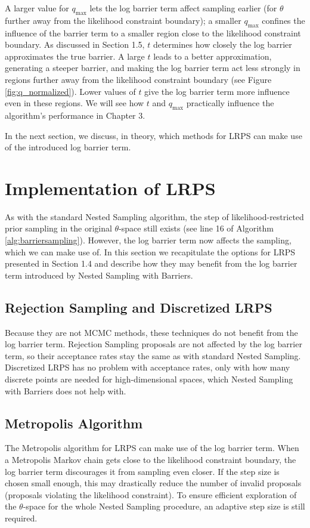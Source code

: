 \documentclass[12pt, a4paper]{report}
\begin{document}
A larger value for $q_{\textrm{max}}$ lets the log barrier term affect sampling earlier (for $\theta$ further away from the likelihood constraint boundary); a smaller $q_{\textrm{max}}$ confines the influence of the barrier term to a smaller region close to the likelihood constraint boundary.
As discussed in Section 1.5, $t$ determines how closely the log barrier approximates the true barrier.
A large $t$ leads to a better approximation, generating a steeper barrier, and making the log barrier term act less strongly in regions further away from the likelihood constraint boundary (see Figure \ref{fig:q_normalized}).
Lower values of $t$ give the log barrier term more influence even in these regions.
We will see how $t$ and $q_{\textrm{max}}$ practically influence the algorithm's performance in Chapter 3.

In the next section, we discuss, in theory, which methods for LRPS can make use of the introduced log barrier term.

\section{Implementation of LRPS}
As with the standard Nested Sampling algorithm, the step of likelihood-restricted prior sampling in the original $\theta$-space still exists (see line 16 of Algorithm \ref{alg:barriersampling}).
However, the log barrier term now affects the sampling, which we can make use of.
In this section we recapitulate the options for LRPS presented in Section 1.4 and describe how they may benefit from the log barrier term introduced by Nested Sampling with Barriers.

\subsection{Rejection Sampling and Discretized LRPS}
Because they are not MCMC methods, these techniques do not benefit from the log barrier term.
Rejection Sampling proposals are not affected by the log barrier term, so their acceptance rates stay the same as with standard Nested Sampling.
Discretized LRPS has no problem with acceptance rates, only with how many discrete points are needed for high-dimensional spaces, which Nested Sampling with Barriers does not help with.

\subsection{Metropolis Algorithm}
The Metropolis algorithm for LRPS can make use of the log barrier term.
When a Metropolis Markov chain gets close to the likelihood constraint boundary, the log barrier term discourages it from sampling even closer.
If the step size is chosen small enough, this may drastically reduce the number of invalid proposals (proposals violating the likelihood constraint).
To ensure efficient exploration of the $\theta$-space for the whole Nested Sampling procedure, an adaptive step size is still required.
\end{document}
